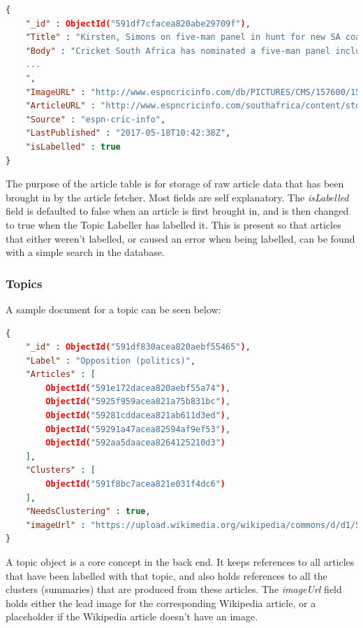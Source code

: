 \documentclass[12pt]{article}
\begin{document}
\begin{lstlisting}[language=json, firstnumber=1, caption={A sample document in the Article table},captionpos=b]
{
    "_id" : ObjectId("591df7cfacea820abe29709f"),
    "Title" : "Kirsten, Simons on five-man panel in hunt for new SA coach",
    "Body" : "Cricket South Africa has nominated a five-man panel including two former national coaches, Gary Kirsten and Eric Simons, to recommend a suitable candidate for the position of head coach, which it aims to fill by the beginning of September
    ...
    ",
    "ImageURL" : "http://www.espncricinfo.com/db/PICTURES/CMS/157600/157626.5.jpg",
    "ArticleURL" : "http://www.espncricinfo.com/southafrica/content/story/1098337.html",
    "Source" : "espn-cric-info",
    "LastPublished" : "2017-05-18T10:42:38Z",
    "isLabelled" : true
}
\end{lstlisting}

The purpose of the article table is for storage of raw article data that has been brought in by the article fetcher. Most fields are self explanatory. The \emph{isLabelled} field is defaulted to false when an article is first brought in, and is then changed to true when the Topic Labeller has labelled it. This is present so that articles that either weren't labelled, or caused an error when being labelled, can be found with a simple search in the database.

\subsubsection{Topics}

A sample document for a topic can be seen below:

\begin{lstlisting}[language=json, firstnumber=1, caption={A sample document in the Topics table},captionpos=b]
{
    "_id" : ObjectId("591df830acea820aebf55465"),
    "Label" : "Opposition (politics)",
    "Articles" : [ 
        ObjectId("591e172dacea820aebf55a74"), 
        ObjectId("5925f959acea821a75b831bc"), 
        ObjectId("59281cddacea821ab611d3ed"), 
        ObjectId("59291a47acea82594af9ef53"), 
        ObjectId("592aa5daacea8264125210d3")
    ],
    "Clusters" : [ 
        ObjectId("591f8bc7acea821e031f4dc6")
    ],
    "NeedsClustering" : true,
    "imageUrl" : "https://upload.wikimedia.org/wikipedia/commons/d/d1/Stand_in_opposition_city_hall_boston.jpg"
}
\end{lstlisting}

A topic object is a core concept in the back end. It keeps references to all articles that have been labelled with that topic, and also holds references to all the clusters (summaries) that are produced from these articles. The \emph{imageUrl} field holds either the lead image for the corresponding Wikipedia article, or a placeholder if the Wikipedia article doesn't have an image. 
\end{document}
